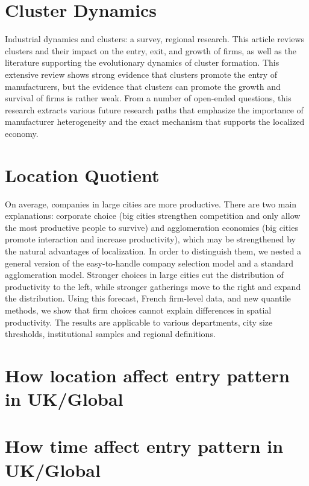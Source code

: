 \documentclass[
  12pt,
  oneside]{book}
\begin{document}
\hypertarget{cluster-dynamics}{%
\section{Cluster Dynamics}\label{cluster-dynamics}}

Industrial dynamics and clusters: a survey, regional research. This article reviews clusters and their impact on the entry, exit, and growth of firms, as well as the literature supporting the evolutionary dynamics of cluster formation. This extensive review shows strong evidence that clusters promote the entry of manufacturers, but the evidence that clusters can promote the growth and survival of firms is rather weak. From a number of open-ended questions, this research extracts various future research paths that emphasize the importance of manufacturer heterogeneity and the exact mechanism that supports the localized economy.

\hypertarget{location-quotient}{%
\section{Location Quotient}\label{location-quotient}}

On average, companies in large cities are more productive. There are two main explanations: corporate choice (big cities strengthen competition and only allow the most productive people to survive) and agglomeration economies (big cities promote interaction and increase productivity), which may be strengthened by the natural advantages of localization. In order to distinguish them, we nested a general version of the easy-to-handle company selection model and a standard agglomeration model. Stronger choices in large cities cut the distribution of productivity to the left, while stronger gatherings move to the right and expand the distribution. Using this forecast, French firm-level data, and new quantile methods, we show that firm choices cannot explain differences in spatial productivity. The results are applicable to various departments, city size thresholds, institutional samples and regional definitions.

\hypertarget{how-location-affect-entry-pattern-in-ukglobal}{%
\section{How location affect entry pattern in UK/Global}\label{how-location-affect-entry-pattern-in-ukglobal}}

\hypertarget{how-time-affect-entry-pattern-in-ukglobal}{%
\section{How time affect entry pattern in UK/Global}\label{how-time-affect-entry-pattern-in-ukglobal}}
\end{document}
